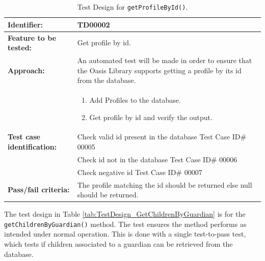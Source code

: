\begin{table}[htbp]
	\centering
		\begin{tabular}{| p{4.5cm} | m{9cm} |}
			\hline
			\textbf{Identifier:}				& TD00002 \\ \hline
			\textbf{Feature to be tested:}		& Get profile by id. \\ \hline
			\textbf{Approach:}					& An automated test will be made in order to ensure that the Oasis Library supports getting a profile by its id from the database. \\
												&	\begin{enumerate}
														\item Add Profiles to the database.
														\item Get profile by id and verify the output.
												\end{enumerate} \\ \hline
			\textbf{Test case identification:}	& Check valid id present in the database Test Case ID\# 00005 \\
												& Check id not in the database Test Case ID\# 00006 \\
												& Check negative id Test Case ID\# 00007 \\ \hline
			\textbf{Pass/fail criteria:}		& The profile matching the id should be returned else null should be returned. \\ \hline
		\end{tabular}
	\caption{Test Design for \texttt{getProfileById()}.}
	\label{tab:TestDesign_GetProfileById}
\end{table}

The test design in Table \vref{tab:TestDesign_GetChildrenByGuardian} is for the \texttt{getChildrenByGuardian()} method.
The test ensures the method performs as intended under normal operation.
This is done with a single test-to-pass test, which tests if children associated to a guardian can be retrieved from the database.

